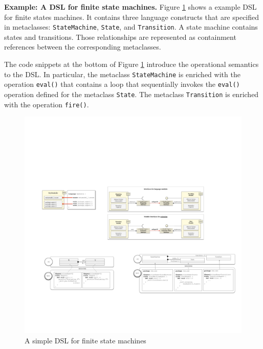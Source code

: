 \textbf{Example: A DSL for finite state machines.}
Figure \ref{fig:k3-example} shows a example DSL for finite states machines. It contains three language constructs that are specified in metaclasses: \texttt{StateMachine}, \texttt{State}, and \texttt{Transition}. A state machine contains states and transitions. Those relationships are represented as containment references between the corresponding metaclasses. 

The code snippets at the bottom of Figure \ref{fig:k3-example} introduce the operational semantics to the DSL. In particular, the metaclass \texttt{StateMachine} is enriched with the operation \texttt{eval()} that contains a loop that sequentially invokes the \texttt{eval()} operation defined for the metaclass \texttt{State}. The metaclass \texttt{Transition} is enriched with the operation \texttt{fire()}.

\begin{figure}
\centering
\includegraphics[width=1\linewidth]{images/k3-example-fig}
\caption{A simple DSL for finite state machines}
\label{fig:k3-example}
\end{figure}

 

